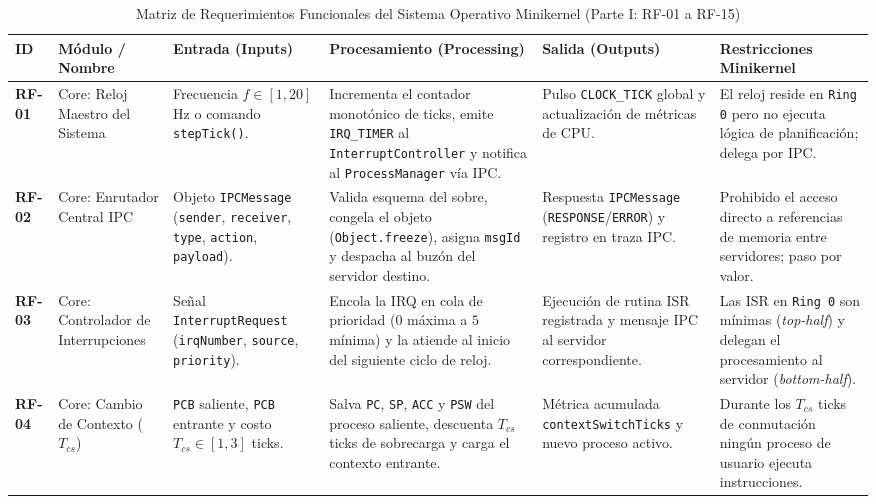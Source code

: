 \documentclass[10pt,twocolumn,letterpaper]{article}
\begin{document}
\begin{table}[!t]
\caption{Matriz de Requerimientos Funcionales del Sistema Operativo Minikernel (Parte I: RF-01 a RF-15)}
\label{tab:rf_parte1}
\centering
\scriptsize
\renewcommand{\arraystretch}{1.18}
\begin{tabularx}{\textwidth}{C{0.9cm} L{2.2cm} L{2.8cm} Y L{2.8cm} L{3.3cm}}
\toprule
\textbf{ID} & \textbf{M\'odulo / Nombre} & \textbf{Entrada (Inputs)} & \textbf{Procesamiento (Processing)} & \textbf{Salida (Outputs)} & \textbf{Restricciones Minikernel} \\
\midrule
\textbf{RF-01} & Core: Reloj Maestro del Sistema & Frecuencia $f \in [1, 20]$ Hz o comando \texttt{stepTick()}. & Incrementa el contador monot\'onico de ticks, emite \texttt{IRQ\_TIMER} al \texttt{InterruptController} y notifica al \texttt{ProcessManager} v\'ia IPC. & Pulso \texttt{CLOCK\_TICK} global y actualizaci\'on de m\'etricas de CPU. & El reloj reside en \texttt{Ring 0} pero no ejecuta l\'ogica de planificaci\'on; delega por IPC. \\
\textbf{RF-02} & Core: Enrutador Central IPC & Objeto \texttt{IPCMessage} (\texttt{sender}, \texttt{receiver}, \texttt{type}, \texttt{action}, \texttt{payload}). & Valida esquema del sobre, congela el objeto (\texttt{Object.freeze}), asigna \texttt{msgId} y despacha al buz\'on del servidor destino. & Respuesta \texttt{IPCMessage} (\texttt{RESPONSE}/\texttt{ERROR}) y registro en traza IPC. & Prohibido el acceso directo a referencias de memoria entre servidores; paso por valor. \\
\textbf{RF-03} & Core: Controlador de Interrupciones & Se\~nal \texttt{InterruptRequest} (\texttt{irqNumber}, \texttt{source}, \texttt{priority}). & Encola la IRQ en cola de prioridad ($0$ m\'axima a $5$ m\'inima) y la atiende al inicio del siguiente ciclo de reloj. & Ejecuci\'on de rutina ISR registrada y mensaje IPC al servidor correspondiente. & Las ISR en \texttt{Ring 0} son m\'inimas (\textit{top-half}) y delegan el procesamiento al servidor (\textit{bottom-half}). \\
\textbf{RF-04} & Core: Cambio de Contexto ($T_{cs}$) & \texttt{PCB} saliente, \texttt{PCB} entrante y costo $T_{cs} \in [1,3]$ ticks. & Salva \texttt{PC}, \texttt{SP}, \texttt{ACC} y \texttt{PSW} del proceso saliente, descuenta $T_{cs}$ ticks de sobrecarga y carga el contexto entrante. & M\'etrica acumulada \texttt{contextSwitchTicks} y nuevo proceso activo. & Durante los $T_{cs}$ ticks de conmutaci\'on ning\'un proceso de usuario ejecuta instrucciones. \\

\end{tabularx}
\end{table}
\end{document}
